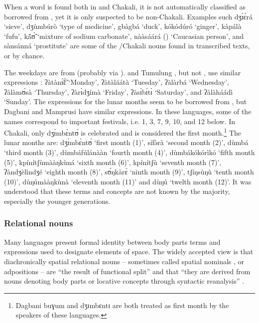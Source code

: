 \begin{exe}
\begin{exe}
\begin{exe}
\begin{exe}
\begin{exe}
\begin{exe}
\begin{exe}
\begin{exe}
\newpage 
When a word is found both in  and Chakali, it is not automatically classified as borrowed from , yet it is only suspected to be non-Chakali.  Examples such {\sls dʒɪ́ɛ́rá} `sieve', {\sls dʒùmbúrò} `type of medicine', {\sls gbàgbá} `duck', {\sls kókódúró}  `ginger', {\sls kàpálà} `fufu', {\sls kã́ʊ̃́}  `mixture of sodium carbonate', {\sls nààsáárá}  () `Caucasian person', and  {\sls sànsánná} `prostitute' are some of the /Chakali nouns found in transcribed texts, or by chance. 

The weekdays are from  (probably via ).  and Tumulung ,  but  not , use similar expressions \citep[60]{nade96}: {\sls ʔàtànɪ̃́ɛ̃̀} `Monday', {\sls ʔàtàláátà} `Tuesday', {\sls ʔàlàrbá} `Wednesday',   {\sls ʔàlàmʊ́sà} `Thursday',  {\sls ʔàrɪ̀dʒímà} `Friday', {\sls ʔàsɪ́bɪ́tɪ̀} `Saturday', and {\sls ʔàlàháádì} `Sunday'.  The expressions for the lunar months seem to be borrowed from , but Dagbani and Mamprusi have similar expressions. In these  languages, some of the names  correspond to important festivals, i.e. 1, 3, 7, 9, 10, and 12 below. In Chakali, only {\sls dʒɪ́mbɛ̀ntʊ́} is celebrated and  is considered the first month.\footnote{Dagbani {\sls buɣum} and  {\sls  dʒɪmbɛntɪ} are both treated as first month by the speakers of these languages.} The lunar months are: {\sls dʒɪ́mbɛ̀ntʊ́} `first month (1)', {\sls sífə̀rà}  `second month (2)', {\sls dùmbá} `third month (3)', {\sls dùmbáfúlánààn} `fourth month (4)',  {\sls dùmbákókórìkó} `fifth month (5)', {\sls kpínítʃùmààŋkùná} `sixth month (6)', {\sls kpínítʃù} `seventh month (7)', {\sls ʔàndʒèlìndʒé} `eighth month (8)', {\sls sʊ́ŋkàrɛ̀} `ninth month (9)', {\sls tʃíŋsùŋù} `tenth month (10)', {\sls dùŋúmààŋkùnà} `eleventh month (11)' and {\sls dùŋú} `twelth month (12)'.  It was understood that these terms and concepts are not known by the majority, especially the younger generations.


\subsubsection{Relational nouns}
\label{sec:SPA-relnoun}


Many  languages present formal identity between body parts terms and expressions used to designate elements of space. The widely accepted view is that diachronically  spatial relational nouns  -- sometimes called spatial nominals \citep[895]{Hell07},  or adpositions  \citep[137]{Hein97} --  are ``the result of functional split'' and that ``they are derived from nouns denoting body parts or locative concepts through syntactic reanalysis'' \citep[256]{Hein84}.




\end{exe}
\end{exe}
\end{exe}
\end{exe}
\end{exe}
\end{exe}
\end{exe}
\end{exe}

